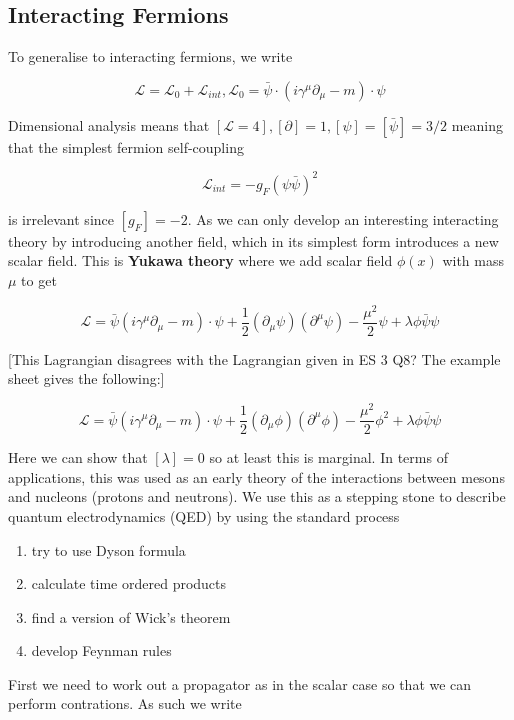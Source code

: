 \documentclass{article}
\theoremstyle{definition}
\begin{document}
\subsection{Interacting Fermions}

To generalise to interacting fermions, we write

$$ \mathcal{L} = \mathcal{L}_0 + \mathcal{L}_{int}, \mathcal{L}_0 = \bar{\psi}
\cdot (i \gamma^\mu \partial_\mu - m) \cdot \psi $$

Dimensional analysis means that $[\mathcal{L} = 4], [\partial] = 1, [\psi] =
[\bar{\psi}] = 3/2$ meaning that the simplest fermion self-coupling

$$ \mathcal{L}_{int} = -g_F (\psi \bar{\psi})^2 $$

is irrelevant since $[g_F] = -2$. As we can only develop an interesting
interacting theory by introducing another field, which in its simplest form
introduces a new scalar field. This is \textbf{Yukawa theory} where we add
scalar field $\phi(x)$ with mass $\mu$ to get

$$ \mathcal{L} = \bar{\psi} (i \gamma^\mu \partial_\mu - m) \cdot \psi +
\frac{1}{2} (\partial_\mu \psi) (\partial^\mu \psi) - \frac{\mu^2}{2} \psi +
\lambda \phi \bar{\psi} \psi $$

[This Lagrangian disagrees with the Lagrangian given in ES 3 Q8? The example
sheet gives the following:]

$$ \mathcal{L} = \bar{\psi} (i \gamma^\mu \partial_\mu - m) \cdot \psi +
\frac{1}{2} (\partial_\mu \phi) (\partial^\mu \phi) - \frac{\mu^2}{2} \phi^2 +
\lambda \phi \bar{\psi} \psi $$

Here we can show that $[\lambda] = 0$ so at least this is marginal. In terms of
applications, this was used as an early theory of the interactions between
mesons and nucleons (protons and neutrons). We use this as a stepping stone to
describe quantum electrodynamics (QED) by using the standard process

\begin{enumerate}
\item try to use Dyson formula
\item calculate time ordered products
\item find a version of Wick's theorem
\item develop Feynman rules
\end{enumerate}

First we need to work out a propagator as in the scalar case so that we can
perform contrations. As such we write
\end{document}
